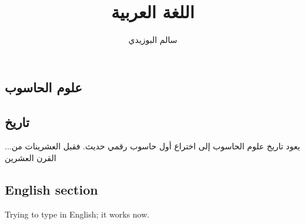 \documentclass[11pt,a4paper]{report}
\title{
	\Huge\textsc{اللغة العربية}
}
\author{سالم البوزيدي}
\begin{document}
	\begin{otherlanguage}{arabic}
		\maketitle
	\end{otherlanguage}
	
	\tableofcontents
	
	\begin{otherlanguage}{arabic}
		\chapter{علوم الحاسوب}
		\section{تاريخ}
		
		...يعود تاريخ علوم الحاسوب إلى اختراع أول حاسوب رقمي حديث. فقبل العشرينات من القرن العشرين                                                 
	\end{otherlanguage}
	
	\section{English section}
	Trying to type in English; it works now.
	
\end{document}
